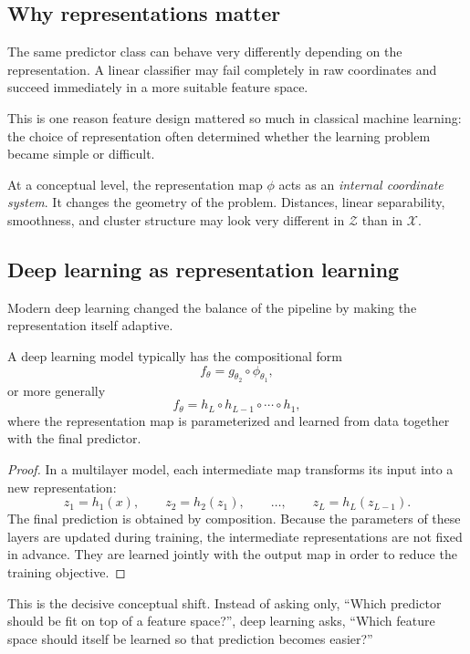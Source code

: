 \subsection*{Why representations matter}

The same predictor class can behave very differently depending on the representation. A linear classifier may fail completely in raw coordinates and succeed immediately in a more suitable feature space.

This is one reason feature design mattered so much in classical machine learning: the choice of representation often determined whether the learning problem became simple or difficult.

At a conceptual level, the representation map $\phi$ acts as an \emph{internal coordinate system}. It changes the geometry of the problem. Distances, linear separability, smoothness, and cluster structure may look very different in $\mathcal Z$ than in $\mathcal X$.

\subsection*{Deep learning as representation learning}

Modern deep learning changed the balance of the pipeline by making the representation itself adaptive.

\begin{proposition}
A deep learning model typically has the compositional form
\[
f_\theta = g_{\theta_2}\circ \phi_{\theta_1},
\]
or more generally
\[
f_\theta = h_L\circ h_{L-1}\circ \cdots \circ h_1,
\]
where the representation map is parameterized and learned from data together with the final predictor.
\end{proposition}

\begin{proof}
In a multilayer model, each intermediate map transforms its input into a new representation:
\[
z_1=h_1(x),\qquad z_2=h_2(z_1),\qquad \dots,\qquad z_L=h_L(z_{L-1}).
\]
The final prediction is obtained by composition. Because the parameters of these layers are updated during training, the intermediate representations are not fixed in advance. They are learned jointly with the output map in order to reduce the training objective.
\end{proof}

This is the decisive conceptual shift. Instead of asking only, ``Which predictor should be fit on top of a feature space?'', deep learning asks, ``Which feature space should itself be learned so that prediction becomes easier?''


